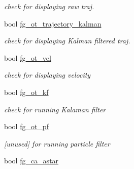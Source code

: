 \begin{DoxyCompactItemize}
\begin{DoxyCompactList}\small\item\em check for displaying raw traj. \end{DoxyCompactList}\item 
\hypertarget{class_sensor_info_a72d293d7c4f782bda708990a24e33cd4}{}bool \hyperlink{class_sensor_info_a72d293d7c4f782bda708990a24e33cd4}{fg\+\_\+ot\+\_\+trajectory\+\_\+kalman}\label{class_sensor_info_a72d293d7c4f782bda708990a24e33cd4}

\begin{DoxyCompactList}\small\item\em check for displaying Kalman filtered traj. \end{DoxyCompactList}\item 
\hypertarget{class_sensor_info_a81403b882ea7e5fec8aa58e7432f0b24}{}bool \hyperlink{class_sensor_info_a81403b882ea7e5fec8aa58e7432f0b24}{fg\+\_\+ot\+\_\+vel}\label{class_sensor_info_a81403b882ea7e5fec8aa58e7432f0b24}

\begin{DoxyCompactList}\small\item\em check for displaying velocity \end{DoxyCompactList}\item 
\hypertarget{class_sensor_info_a8d65786045ff99eddfc80f8db962e19d}{}bool \hyperlink{class_sensor_info_a8d65786045ff99eddfc80f8db962e19d}{fg\+\_\+ot\+\_\+kf}\label{class_sensor_info_a8d65786045ff99eddfc80f8db962e19d}

\begin{DoxyCompactList}\small\item\em check for running Kalaman filter \end{DoxyCompactList}\item 
\hypertarget{class_sensor_info_a11d1247334e1bbb62a0fd8eca9c6addc}{}bool \hyperlink{class_sensor_info_a11d1247334e1bbb62a0fd8eca9c6addc}{fg\+\_\+ot\+\_\+pf}\label{class_sensor_info_a11d1247334e1bbb62a0fd8eca9c6addc}

\begin{DoxyCompactList}\small\item\em \mbox{[}unused\mbox{]} for running particle filter \end{DoxyCompactList}\item 
\hypertarget{class_sensor_info_ac5aae66f8cbfb76ef869f1b474c64707}{}bool \hyperlink{class_sensor_info_ac5aae66f8cbfb76ef869f1b474c64707}{fg\+\_\+ca\+\_\+astar}\label{class_sensor_info_ac5aae66f8cbfb76ef869f1b474c64707}


\end{DoxyCompactItemize}
